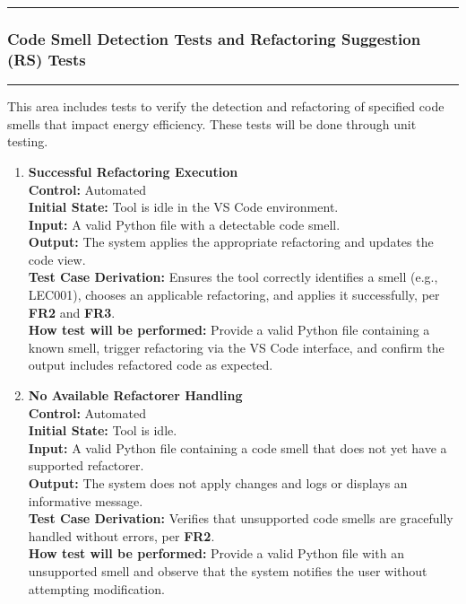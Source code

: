 \documentclass[12pt, titlepage]{article}
\newcommand{\colorrule}{\textcolor{BlueViolet}{\rule{\linewidth}{2pt}}}
\begin{document}
\begin{enumerate}[label={\bf
    \textcolor{Maroon}{test-FR-IA-\arabic*}}, wide=0pt, font=\itshape]
\end{enumerate}

\noindent\colorrule


\subsubsection{Code Smell Detection Tests and Refactoring
Suggestion (RS) Tests} \label{4.1.2}
\colorrule

\medskip

\noindent
This area includes tests to verify the detection and refactoring
of specified code smells that impact energy efficiency. These tests will be
done through unit testing.

\begin{enumerate}[label={\bf
\textcolor{Maroon}{test-FR-IA-\arabic*}}, wide=0pt, font=\itshape]
\item \textbf{Successful Refactoring Execution} \\[2mm]
\textbf{Control:} Automated \\
\textbf{Initial State:} Tool is idle in the VS Code environment. \\
\textbf{Input:} A valid Python file with a detectable code smell. \\
\textbf{Output:} The system applies the appropriate refactoring and updates the code view. \\[2mm]
\textbf{Test Case Derivation:} Ensures the tool correctly identifies a smell (e.g., LEC001), chooses an applicable refactoring, and applies it successfully, per \textbf{FR2} and \textbf{FR3}. \\[2mm]
\textbf{How test will be performed:} Provide a valid Python file containing a known smell, trigger refactoring via the VS Code interface, and confirm the output includes refactored code as expected.

\item \textbf{No Available Refactorer Handling} \\[2mm]
\textbf{Control:} Automated \\
\textbf{Initial State:} Tool is idle. \\
\textbf{Input:} A valid Python file containing a code smell that does not yet have a supported refactorer. \\
\textbf{Output:} The system does not apply changes and logs or displays an informative message. \\[2mm]
\textbf{Test Case Derivation:} Verifies that unsupported code smells are gracefully handled without errors, per \textbf{FR2}. \\[2mm]
\textbf{How test will be performed:} Provide a valid Python file with an unsupported smell and observe that the system notifies the user without attempting modification.


\end{enumerate}
\end{document}
